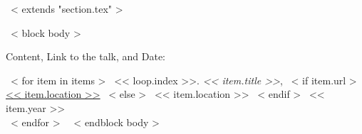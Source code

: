 ~< extends "section.tex" >~

~< block body >~

Content, Link to the talk, and Date:

  ~< for item in items >~
    << loop.index >>. \emph{<< item.title >>},
    ~< if item.url >~
      \href{<< item.url >>}{<< item.location >>}
    ~< else >~
      << item.location >>
  ~< endif >~
  \hfill << item.year >> \\
  ~< endfor >~
~< endblock body >~
